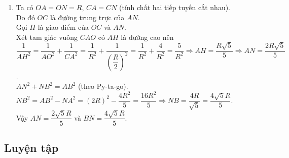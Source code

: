 \begin{vd}
{\begin{enumerate}
			Vậy $AB$ tiếp xúc với đường tròn đường kính $CD$.
			\item Ta có $OA = ON=R$, $CA = CN$ (tính chất hai tiếp tuyến cắt nhau).\\
			Do đó $OC$ là đường trung trực của $AN$.\\
			Gọi $H$ là giao điểm của $OC$ và $AN$.\\
			Xét tam giác vuông $CAO$ có $AH$ là đường cao nên\\
			$\dfrac{1}{AH^2}=\dfrac{1}{AO^2}+\dfrac{1}{CA^2}=\dfrac{1}{R^2}+\dfrac{1}{\left(\dfrac{R}{2}\right)^2}=\dfrac{1}{R^2}+\dfrac{4}{R^2}=\dfrac{5}{R^2}\Rightarrow AH=\dfrac{R\sqrt{5}}{5}\Rightarrow AN=\dfrac{2R\sqrt{5}}{5}$.\\
			$AN^2+NB^2=AB^2$ (theo Py-ta-go).\\
			$NB^2=AB^2-NA^2=(2R)^2-\dfrac{4R^2}{5}=\dfrac{16R^2}{5}\Rightarrow NB=\dfrac{4R}{\sqrt{5}}=\dfrac{4\sqrt{5}R}{5}$.\\
			Vậy $AN=\dfrac{2\sqrt{5}R}{5}$ và $BN=\dfrac{4\sqrt{5}R}{5}$.
		\end{enumerate}
	}
\end{vd}

\subsection{Luyện tập}

